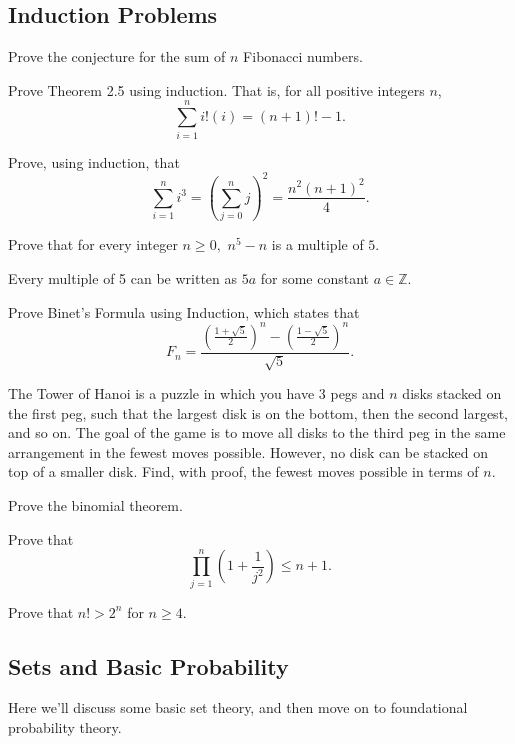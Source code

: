 \documentclass[11pt]{article}
\newcommand{\important}{$\blacktriangleright\,$}
\begin{document}
\subsection*{Induction Problems}
\begin{problem}[10]
    Prove the conjecture for the sum of $n$ Fibonacci numbers.
\end{problem}
\begin{problem}[15]
    Prove Theorem 2.5 using induction. That is, for all positive integers $n$,
	\[\sum_{i=1}^n i!(i) = (n+1)! - 1.\]
\end{problem}
\begin{problem}[20]
    Prove, using induction, that
    \[\sum_{i=1}^n i^3 = \left(\sum_{j=0}^n j\right)^2 = \frac{n^2(n + 1)^2}{4}.\]
\end{problem}
\begin{problem}[\important 25]
    Prove that for every integer $n \geq 0,$ $n^5 - n$ is a multiple of $5.$ 
    \begin{hint}
        Every multiple of 5 can be written as $5a$ for some constant $a \in \mathbb{Z}.$
    \end{hint}
\end{problem}
\begin{problem}[25]
    Prove Binet's Formula using Induction, which states that
	\[F_n = \frac{\left(\frac{1+\sqrt 5}{2}\right)^n - \left(\frac{1 - \sqrt 5}{2}\right)^n}{\sqrt 5}.\]
\end{problem}
\begin{problem}[25]
    The Tower of Hanoi is a puzzle in which you have $3$ pegs and $n$ disks stacked on the first peg, such that the largest disk is on the bottom, then the second largest, and so on. The goal of the game is to move all disks to the third peg in the same arrangement in the fewest moves possible. However, no disk can be stacked on top of a smaller disk. Find, with proof, the fewest moves possible in terms of $n$.
\end{problem}
\begin{problem}[\important 20]
    Prove the binomial theorem.
\end{problem}
\begin{problem}[30]
    Prove that
	\[\prod_{j=1}^n \left(1 + \frac{1}{j^2}\right) \leq n+1.\]
\end{problem}
\begin{problem}[35]
    Prove that $n! > 2^n$ for $n \geq 4.$
\end{problem}

\subsection{Sets and Basic Probability}
Here we'll discuss some basic set theory, and then move on to foundational probability theory.
\end{document}
